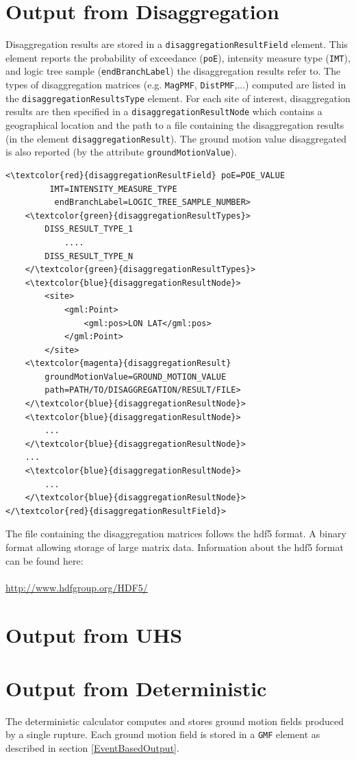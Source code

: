 \section{Output from Disaggregation}
Disaggregation results are stored in a \Verb+disaggregationResultField+ element. This element reports the probability of exceedance (\Verb+poE+), intensity measure type (\Verb+IMT+), and logic tree sample (\Verb+endBranchLabel+) the disaggregation results refer to. The types of disaggregation matrices (e.g. \Verb+MagPMF+, \Verb+DistPMF+,...) computed are listed in the \Verb+disaggregationResultsType+ element. For each site of interest, disaggregation results are then specified in a \Verb+disaggregationResultNode+ which contains a geographical location and the path to a file containing the disaggregation results (in the element \Verb+disaggregationResult+). The ground motion value disaggregated is also reported (by the attribute \Verb+groundMotionValue+).
\begin{Verbatim}[frame=single, commandchars=\\\{\}, samepage=true]
<\textcolor{red}{disaggregationResultField} poE=POE_VALUE
		 IMT=INTENSITY_MEASURE_TYPE
		  endBranchLabel=LOGIC_TREE_SAMPLE_NUMBER>
	<\textcolor{green}{disaggregationResultTypes}>
		DISS_RESULT_TYPE_1 
			....
		DISS_RESULT_TYPE_N
	</\textcolor{green}{disaggregationResultTypes}>
	<\textcolor{blue}{disaggregationResultNode}>
		<site>
			<gml:Point>
				<gml:pos>LON LAT</gml:pos>
			</gml:Point>
		</site>
	<\textcolor{magenta}{disaggregationResult} 
		groundMotionValue=GROUND_MOTION_VALUE 
		path=PATH/TO/DISAGGREGATION/RESULT/FILE>
	</\textcolor{blue}{disaggregationResultNode}>
	<\textcolor{blue}{disaggregationResultNode}>
		...
	</\textcolor{blue}{disaggregationResultNode}>
	...
	<\textcolor{blue}{disaggregationResultNode}>
		...
	</\textcolor{blue}{disaggregationResultNode}>
</\textcolor{red}{disaggregationResultField}>
\end{Verbatim}
The file containing the disaggregation matrices follows the hdf5 format. A binary format allowing storage of large matrix data. Information about the hdf5 format can be found here:\\ \\
\href{http://www.hdfgroup.org/HDF5/}
   {http://www.hdfgroup.org/HDF5/}


\section{Output from UHS}

\section{Output from Deterministic}
The deterministic calculator computes and stores ground motion fields produced by a single rupture. Each ground motion field is stored in a \Verb+GMF+ element as described in section \ref{EventBasedOutput}.